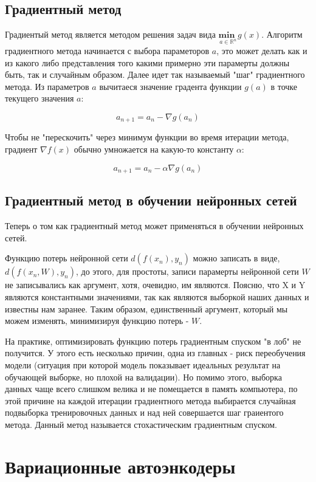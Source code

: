 \documentclass{article}
\begin{document}
\subsection{Градиентный метод}
Градиентый метод является методом решения задач вида $\underset{a \in \mathds{R}^n}{\textbf{min }} g(x)$. Алгоритм градиентного метода начинается с выбора
параметоров $a$, это может делать как и из какого либо представления того какими примерно эти парамерты должны быть, так и случайным образом. Далее
идет так называемый "шаг" градиентного метода. Из параметров $a$ вычитаеся значение градента функции $g(a)$ в точке текущего значения $a$:

$$ a_{n + 1} = a_n - \nabla g(a_n)$$

Чтобы не "перескочить" через минимум функции во время итерации метода, градиент $\nabla f(x)$ обычно умножается на какую-то константу $\alpha$:

$$ a_{n + 1} = a_n - \alpha \nabla g(a_n)$$

\subsection{Градиентный метод в обучении нейронных сетей}
Теперь о том как градиентный метод может применяться в обучении нейронных сетей.

Функцию потерь нейронной сети $d(f(x_n), y_n)$ можно записать в виде, $d(f(x_n, W), y_n)$, до этого, для простоты, записи парамерты нейронной сети $W$ не записывались
как аргумент, хотя, очевидно, им являются. Поясню, что X и Y являются константными значениями, так как являются выборкой наших
данных и известны нам заранее. Таким образом, единственный аргумент, который мы можем изменять, минимизируя функцию потерь - $W$.

На практике, оптимизировать функцию потерь градиентным спуском "в лоб" не получится. У этого есть несколько причин, одна из главных - риск переобучения
модели (ситуация при которой модель показывает идеальных результат на обучающей выборке, но плохой на валидации). Но помимо этого, выборка данных
чаще всего слишком велика и не помещается в память компьютера, по этой причине на каждой итерации градиентного метода выбирается случайная подвыборка
тренировочных данных и над ней совершается шаг граиентого метода. Данный метод называется стохастическим градиентным спуском.

\section{Вариационные автоэнкодеры}
\end{document}
